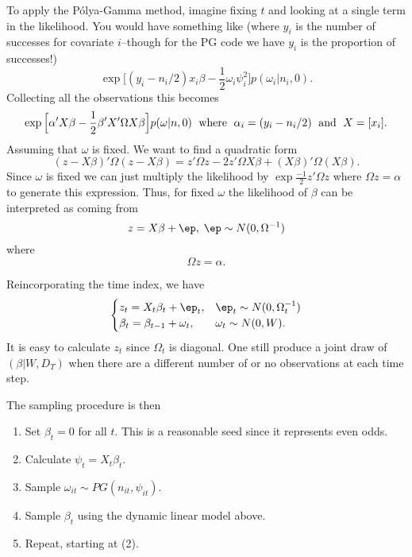\documentclass[11pt]{article}
\newcommand{\Polya}{P\'{o}lya}
\begin{document}
To apply the \Polya-Gamma method, imagine fixing $t$ and looking at a single
term in the likelihood.  You would have something like (where $y_i$ is the
number of successes for covariate $i$--though for the PG code we have $y_i$ is
the proportion of successes!)
\[
\exp \Big[ (y_{i} - n_{i}/2) x_{i} \beta - \frac{1}{2} \omega_{i} \psi_i^2
\Big] 
p(\omega_i | n_i, 0). 
\]
Collecting all the observations this becomes
\[
\exp \Big[ \alpha' X \beta - \frac{1}{2} \beta' X' \Omega X \beta \Big]
p(\omega | n, 0) \;
\textmd{ where } \;
\alpha_i = (y_i - n_i/2) \; \textmd{ and } \; X = [x_i].
\]
Assuming that $\omega$ is fixed.  We want to find a quadratic form
\[
(z - X \beta)' \Omega (z - X \beta) = z' \Omega z - 2 z' \Omega X \beta + (X
\beta)' \Omega (X \beta).
\]
Since $\omega$ is fixed we can just multiply the likelihood by $\exp
\frac{-1}{2} z' \Omega z$ where $\Omega z = \alpha$ to generate this expression.
Thus, for fixed $\omega$ the likelihood of $\beta$ can be interpreted as coming from
\[
z = X \beta + \ep, \; \ep \sim N(0, \Omega^{-1})
\]
where
\[
\Omega z = \alpha.
\]
\begin{comment}
(Waving my hands: We have $\Omega z = \alpha = y - n/2$.  Thus we should have $y
= \Omega z + n/2$.  Use for generating synthetic data?  No, its pseudo-data.)
\end{comment}
Reincorporating the time index, we have
\[
\begin{cases}
z_t = X_t \beta_t + \ep_t, & \ep_t \sim N(0, \Omega_t^{-1}) \\
\beta_t = \beta_{t-1} + \omega_t, & \omega_t \sim N(0, W).
\end{cases}
\]
It is easy to calculate $z_t$ since $\Omega_t$ is diagonal.  One still produce a
joint draw of $(\beta | W, D_T)$ when there are a different number of or no
observations at each time step.
\begin{comment}
  The one place that we need to be careful is that there may be a variable
  number of observations at each point in time.  Thus the number of rows in
  $z_t$ and $X_t$ is $m_t$, which may vary.  Also, it may be the case that there
  are no observations, in which case we have the equivalent of missing data.  I
  believe the dynamic linear model shouldn't have a problem with that.
\end{comment}
The sampling procedure is then
\begin{enumerate}
\item Set $\beta_t = 0$ for all $t$.  This is a reasonable seed since it
  represents even odds.
\item Calculate $\psi_t = X_t \beta_t$.
\item Sample $\omega_{it} \sim PG(n_{it}, \psi_{it})$.
\item Sample $\beta_t$ using the dynamic linear model above.
\item Repeat, starting at (2).
\end{enumerate}
\end{document}
